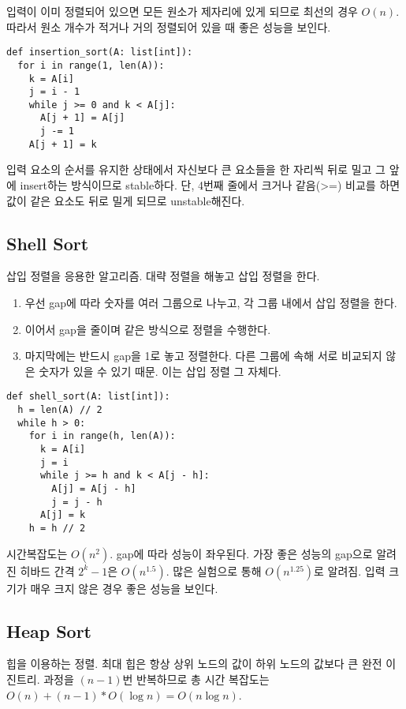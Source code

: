입력이 이미 정렬되어 있으면 모든 원소가 제자리에 있게 되므로 최선의 경우 $O(n)$. 따라서 원소 개수가 적거나 거의 정렬되어 있을 때 좋은 성능을 보인다.

\begin{verbatim}
def insertion_sort(A: list[int]):
  for i in range(1, len(A)):
    k = A[i]
    j = i - 1
    while j >= 0 and k < A[j]:
      A[j + 1] = A[j]
      j -= 1
    A[j + 1] = k
\end{verbatim}

입력 요소의 순서를 유지한 상태에서 자신보다 큰 요소들을 한 자리씩 뒤로 밀고 그 앞에 insert하는 방식이므로 stable하다. 단, 4번째 줄에서 크거나 같음(>=) 비교를 하면 값이 같은 요소도 뒤로 밀게 되므로 unstable해진다.

\subsection{Shell Sort}

삽입 정렬을 응용한 알고리즘. 대략 정렬을 해놓고 삽입 정렬을 한다.

\begin{enumerate}
  \item 우선 gap에 따라 숫자를 여러 그룹으로 나누고, 각 그룹 내에서 삽입 정렬을 한다.
  \item 이어서 gap을 줄이며 같은 방식으로 정렬을 수행한다.
  \item 마지막에는 반드시 gap을 1로 놓고 정렬한다. 다른 그룹에 속해 서로 비교되지 않은 숫자가 있을 수 있기 때문. 이는 삽입 정렬 그 자체다.
\end{enumerate}

\begin{verbatim}
def shell_sort(A: list[int]):
  h = len(A) // 2
  while h > 0:
    for i in range(h, len(A)):
      k = A[i]
      j = i
      while j >= h and k < A[j - h]:
        A[j] = A[j - h]
        j = j - h
      A[j] = k
    h = h // 2
\end{verbatim}

시간복잡도는 $O(n^2)$. gap에 따라 성능이 좌우된다. 가장 좋은 성능의 gap으로 알려진 히바드 간격 $2^k - 1$은 $O(n^{1.5})$. 많은 실험으로 통해 $O(n^{1.25})$로 알려짐. 입력 크기가 매우 크지 않은 경우 좋은 성능을 보인다.

\subsection{Heap Sort}

힙을 이용하는 정렬. 최대 힙은 항상 상위 노드의 값이 하위 노드의 값보다 큰 완전 이진트리. 과정을 $(n - 1)$번 반복하므로 총 시간 복잡도는 $O(n) + (n - 1) * O(\log n) = O(n \log n)$.

